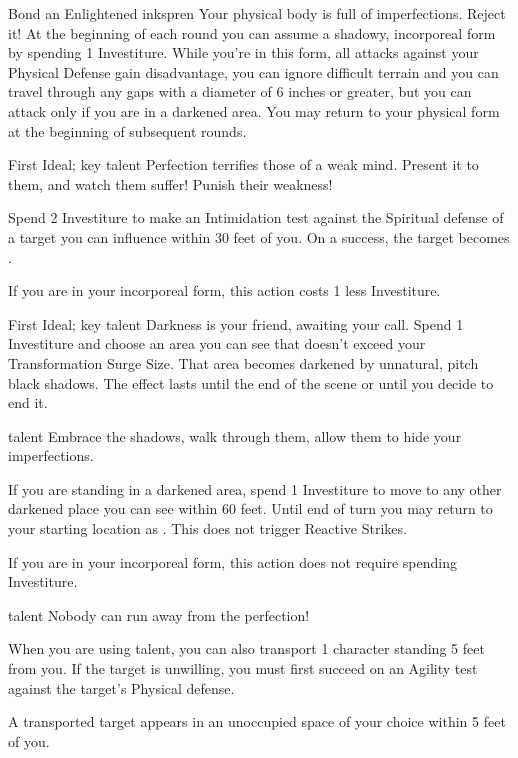 		{Bond an Enlightened inkspren}
		{\iconSpecial}
		{Your physical body is full of imperfections. Reject it!}
		{At the beginning of each round you can assume a shadowy, incorporeal form by spending 1 Investiture. While you're in this form, all attacks against your Physical Defense gain disadvantage, you can ignore difficult terrain and you can travel through any gaps with a diameter of 6 inches or greater, but you can attack only if you are in a darkened area. You may return to your physical form at the beginning of subsequent rounds.}
	

\newpage
\talent{\talentElsecallerDirgeName}
		{First Ideal; \talentElsecallerKeyName{} key talent}
		{\iconAction}
		{Perfection terrifies those of a weak mind. Present it to them, and watch them suffer! Punish their weakness!}
		{Spend 2 Investiture to make an Intimidation test against the Spiritual defense of a target you can influence within 30 feet of you. On a success, the target becomes . 
			
		If you are in your incorporeal form, this action costs 1 less Investiture.}
		
\talent{\talentElsecallerStealLightName}
		{First Ideal; \talentElsecallerKeyName{} key talent}
		{\iconAction}
		{Darkness is your friend, awaiting your call.}
		{Spend 1 Investiture and choose an area you can see that doesn't exceed your Transformation Surge Size. That area becomes darkened by unnatural, pitch black shadows. The effect lasts until the end of the scene or until you decide to end it.}
		
\talent{\talentElsecallerMistyStepName}
		{\talentElsecallerStealLightName{} talent}
		{\iconAction}
		{Embrace the shadows, walk through them, allow them to hide your imperfections.}
		{If you are standing in a darkened area, spend 1 Investiture to move to any other darkened place you can see within 60 feet. Until end of turn you may return to your starting location as \iconFreeAction{}. This does not trigger Reactive Strikes. 

		If you are in your incorporeal form, this action does not require spending Investiture.}
		
\talent{\talentElsecallerDragName}
		{\talentElsecallerMistyStepName{} talent}
		{\iconConstant}
		{Nobody can run away from the perfection!}
		{When you are using \talentElsecallerMistyStepName{} talent, you can also transport 1 character standing 5 feet from you. If the target is unwilling, you must first succeed on an Agility test against the target’s Physical defense. 

		A transported target appears in an unoccupied space of your choice within 5 feet of you.}
		


		